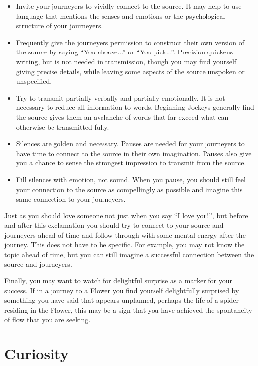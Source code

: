 \documentclass[12pt]{book}
\begin{document}
	\begin{itemize}
\item 
  Invite your journeyers to vividly connect to the source. It may help to use language that mentions the senses and emotions or the psychological structure of your journeyers.
\item 		
  Frequently give the journeyers permission to construct their own version of the source by saying ``You choose...'' or ``You pick...''.
  Precision quickens writing, but is not needed in transmission, though you may find yourself giving precise details, while leaving some aspects of the source unspoken or unspecified.
\item 		
  Try to transmit partially verbally and partially emotionally. It is not necessary to reduce all information to words. Beginning Jockeys  generally find the source gives them an avalanche of words that far exceed what can otherwise  be transmitted fully.
\item 		
Silences are golden and necessary. Pauses are needed for your journeyers to have time to connect to the source in their own imagination.
Pauses also give you a chance to sense the strongest impression to transmit from the source.
\item 
Fill silences with emotion, not sound. When you pause, you should still feel your connection to the source as compellingly as possible and imagine this same connection to your journeyers.
\end{itemize}
  
					
Just as you should love someone not just when you say ``I love you!'', but before and after this exclamation you should try to connect to your source and journeyers ahead of time and follow through with some mental energy after the journey. This does not have to be specific. For example, you may not know the topic ahead of time, but you can still imagine a successful connection between the source and journeyers.
					
Finally, you may want to watch for delightful surprise as a marker for your success. If in a journey to a Flower you find yourself delightfully surprised by something you have said that appears unplanned, perhaps the life of a spider residing in the Flower, this may be a sign that you have achieved the spontaneity of flow that you are seeking.
				
			
\chapter{Curiosity}
\end{document}
